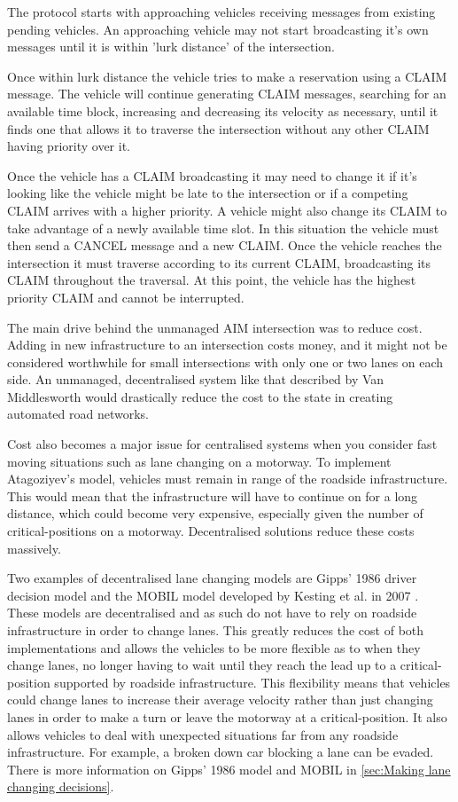 The protocol starts with approaching vehicles receiving messages from existing pending vehicles. An approaching vehicle may not start broadcasting it's own messages until it is within 'lurk distance' of the intersection. 

Once within lurk distance the vehicle tries to make a reservation using a CLAIM message. The vehicle will continue generating CLAIM messages, searching for an available time block, increasing and decreasing its velocity as necessary, until it finds one that allows it to traverse the intersection without any other CLAIM having priority over it.

Once the vehicle has a CLAIM broadcasting it may need to change it if it's looking like the vehicle might be late to the intersection or if a competing CLAIM arrives with a higher priority. A vehicle might also change its CLAIM to take advantage of a newly available time slot. In this situation the vehicle must then send a CANCEL message and a new CLAIM. Once the vehicle reaches the intersection it must traverse according to its current CLAIM, broadcasting its CLAIM throughout the traversal. At this point, the vehicle has the highest priority CLAIM and cannot be interrupted.

The main drive behind the unmanaged AIM intersection was to reduce cost. Adding in new infrastructure to an intersection costs money, and it might not be considered worthwhile for small intersections with only one or two lanes on each side. An unmanaged, decentralised system like that described by Van Middlesworth would drastically reduce the cost to the state in creating automated road networks.

Cost also becomes a major issue for centralised systems when you consider fast moving situations such as lane changing on a motorway. To implement Atagoziyev's model, vehicles must remain in range of the roadside infrastructure. This would mean that the infrastructure will have to continue on for a long distance, which could become very expensive, especially given the number of critical-positions on a motorway. Decentralised solutions reduce these costs massively.

Two examples of decentralised lane changing models are Gipps' 1986 driver decision model \citep{Gipps1986} and the MOBIL model developed by Kesting et al. in 2007 \citep{Kesting2007}. These models are decentralised and as such do not have to rely on roadside infrastructure in order to change lanes. This greatly reduces the cost of both implementations and allows the vehicles to be more flexible as to when they change lanes, no longer having to wait until they reach the lead up to a critical-position supported by roadside infrastructure. This flexibility means that vehicles could change lanes to increase their average velocity rather than just changing lanes in order to make a turn or leave the motorway at a critical-position. It also allows vehicles to deal with unexpected situations far from any roadside infrastructure. For example, a broken down car blocking a lane can be evaded. There is more information on Gipps' 1986 model and MOBIL in \ref{sec:Making lane changing decisions}.


